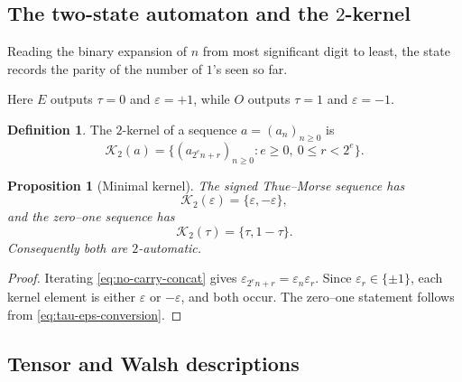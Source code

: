 \documentclass[11pt,oneside]{article}
\newtheorem{proposition}[theorem]{Proposition}
\theoremstyle{definition}
\newtheorem{definition}[theorem]{Definition}
\theoremstyle{remark}
\newcommand{\eps}{\varepsilon}
\begin{document}
\subsection{The two-state automaton and the \texorpdfstring{$2$}{2}-kernel}

Reading the binary expansion of $n$ from most significant digit to least, the
state records the parity of the number of $1$'s seen so far.

\begin{center}
\end{center}
Here $E$ outputs $\tau=0$ and $\eps=+1$, while $O$ outputs $\tau=1$ and
$\eps=-1$.

\begin{definition}
The $2$-kernel of a sequence $a=(a_n)_{n\ge0}$ is
\[
 \mathcal K_2(a)=\bigl\{(a_{2^en+r})_{n\ge0}:e\ge0,\ 0\le r<2^e\bigr\}.
\]
\end{definition}

\begin{proposition}[Minimal kernel]\label{prop:kernel}
The signed Thue--Morse sequence has
\[
  \mathcal K_2(\eps)=\{\eps,-\eps\},
\]
and the zero--one sequence has
\[
  \mathcal K_2(\tau)=\{\tau,1-\tau\}.
\]
Consequently both are $2$-automatic.
\end{proposition}

\begin{proof}
Iterating \cref{eq:no-carry-concat} gives
$\eps_{2^en+r}=\eps_n\eps_r$.  Since $\eps_r\in\{\pm1\}$, each kernel element
is either $\eps$ or $-\eps$, and both occur.  The zero--one statement follows
from \cref{eq:tau-eps-conversion}.
\end{proof}

\subsection{Tensor and Walsh descriptions}
\end{document}
